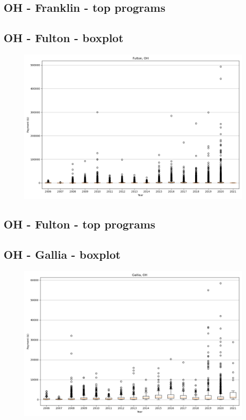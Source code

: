\subsection*{OH - Franklin - top programs}

\newpage
\subsection*{OH - Fulton - boxplot}
\begin{figure}[h]
\centering
\includegraphics[width=7in]{../output/boxplots/counties/Fulton-OH_boxplot.png}
\end{figure}


\subsection*{OH - Fulton - top programs}

\newpage
\subsection*{OH - Gallia - boxplot}
\begin{figure}[h]
\centering
\includegraphics[width=7in]{../output/boxplots/counties/Gallia-OH_boxplot.png}
\end{figure}


